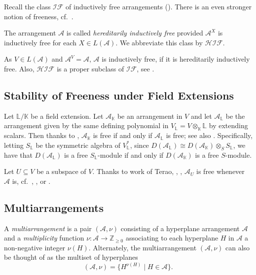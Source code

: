 Recall the class ${{\mathcal {IF}}}$ of 
inductively free arrangements (\cite[Def.\ 4.53]{orlikterao:arrangements}).
There is an even stronger notion of freeness,
cf.\  \cite[\S 6.4, p.~253]{orlikterao:arrangements}.

\begin{defn}
\label{def:heredindfree}
The arrangement ${{\mathcal A}}$ is called 
\emph{hereditarily inductively free} provided 
${{\mathcal A}}^X$ is inductively free for each $X \in L({{\mathcal A}})$.
We abbreviate this class by ${{\mathcal {HIF}}}$.
\end{defn}

As $V \in L({{\mathcal A}})$ and ${{\mathcal A}}^V = {{\mathcal A}}$, 
${{\mathcal A}}$ is inductively free, if it is 
hereditarily inductively free.
Also, ${{\mathcal {HIF}}}$ is a proper subclass of 
${{\mathcal {IF}}}$, see \cite[Ex.\ 2.16]{hogeroehrle:indfree}.

\subsection{Stability of Freeness under Field Extensions}
\label{ssec:stability}
Let ${{\mathbb L}}/{{\mathbb K}}$ be a field extension.
Let ${{\mathcal A}}_{{\mathbb K}}$ be an arrangement in $V$ and let
${{\mathcal A}}_{{\mathbb L}}$ be the  arrangement given by the same
defining polynomial  in $V_{{\mathbb L}} = V \otimes_{{\mathbb K}} {{\mathbb L}} $
by extending scalars.
Then thanks to \cite[Lem.\ 1]{terao:freefinitefields}, 
${{\mathcal A}}_{{\mathbb K}}$ is free if and only if ${{\mathcal A}}_{{\mathbb L}}$ is free;
see also \cite[Thm.\ 1.5(i)]{ziegler:matroids}.
Specifically, 
letting $S_{{\mathbb L}}$ be the symmetric algebra of  $V_{{\mathbb L}}^*$, 
since 
$D({{\mathcal A}}_{{\mathbb L}}) \cong D({{\mathcal A}}_{{\mathbb K}}) \otimes_S S_{{\mathbb L}}$,
we have that 
$D({{\mathcal A}}_{{\mathbb L}})$ is a free $S_{{\mathbb L}}$-module if and only if 
$D({{\mathcal A}}_{{\mathbb K}})$ is a free $S$-module.

Let $U \subseteq V$ be a subspace of $V$.
Thanks to work of Terao, 
\cite[Prop.\ 5.5]{terao:generalizedexponents},  
\cite[Prop.\ 2]{terao:freefinitefields}, 
${{\mathcal A}}_U$ is free whenever ${{\mathcal A}}$ is,
cf.~\cite[Thm.\ 1.7(i)]{ziegler:matroids},
\cite[Thm.\ 4.37]{orlikterao:arrangements},
or \cite[Prop.\ 1.15]{yoshinaga:free14}.

\subsection{Multiarrangements}
\label{ssec:multi}
A \emph{multiarrangement}  is a pair
$({{\mathcal A}}, \nu)$ consisting of a hyperplane arrangement ${{\mathcal A}}$ and a 
\emph{multiplicity} function
$\nu : {{\mathcal A}} \to {{\mathbb Z}}_{\ge 0}$ associating 
to each hyperplane $H$ in ${{\mathcal A}}$ a non-negative integer $\nu(H)$.
Alternately, the multiarrangement $({{\mathcal A}}, \nu)$ can also be thought of as
the multiset of hyperplanes
\[
({{\mathcal A}}, \nu) = \{H^{\nu(H)} \mid H \in {{\mathcal A}}\}.
\]

